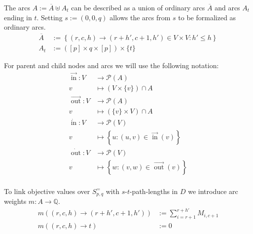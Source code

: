 \documentclass[a4paper]{amsart}
\theoremstyle{definition}
\DeclareMathOperator{\In}{in}
\DeclareMathOperator{\Out}{out}
\newcommand{\ina}{\ensuremath{\vec{\In}}}
\newcommand{\outa}{\ensuremath{\vec{\Out}}}
\newcommand{\inv}{\ensuremath{\dot{\In}}}
\newcommand{\outv}{\ensuremath{\dot{\Out}}}
\begin{document}
The arcs \(A := \overline{A} \uplus A_t\) can be described as a union
of ordinary arcs \(\overline{A}\) and arcs \(A_t\) ending in \(t\).  Setting
\(s:=(0, 0, q)\) allows the arcs from $s$ to be formalized as
ordinary arcs.
\begin{align}
  \overline{A} &:=
  \left\{ \left(r, c, h\right) \rightarrow \left(r+h', c+1, h'\right) \in V \times V \colon
  h' \leq h \right\} \\
  A_t &:= ([p] \times {q} \times [p]) \times \{t\}
\end{align}

For parent and child nodes and arcs we will use the following notation:
\begin{align*}
\ina\colon  V &\to \mathcal{P}(A) \\
v &\mapsto \left(V \times \{v\}\right) \cap A\\
\outa\colon  V &\to \mathcal{P}(A) \\
v &\mapsto \left(\{v\} \times V\right) \cap A\\
\inv\colon  V &\to \mathcal{P}(V) \\
v &\mapsto \left\{ u \colon \left(u, v\right) \in \ina(v) \right\}\\
\outv\colon  V &\to \mathcal{P}(V) \\
v &\mapsto \left\{w \colon \left(v, w\right) \in \outa\left(v\right) \right\}\\
\end{align*}

To link objective values over \(S^=_{p, q}\) with
\(s\)-\(t\)-path-lengths in \(D\) we introduce arc weights \(m\colon A \to \mathbb{Q}\).
\begin{align}
\label{objLink}
  m\left(\left(r, c, h\right) \rightarrow \left(r+h', c+1, h'\right) \right) & := \sum_{i=r+1}^{r+h'} M_{i, c+1} \\
  m\left(\left(r, c, h\right) \rightarrow t \right) & := 0
\end{align}

\end{document}
